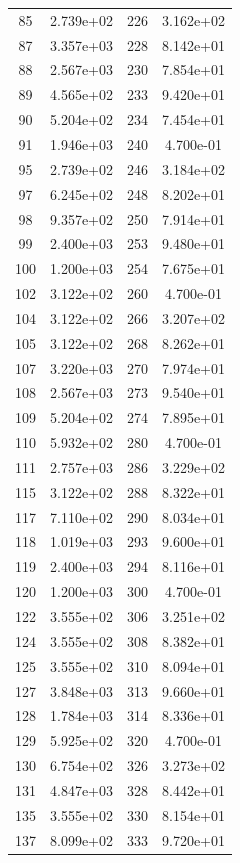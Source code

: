 \documentclass[12pt]{article}
\begin{document}
\begin{longtable}{@{}cccc@{}}
85 & 2.739e+02 & 226 & 3.162e+02 \\
87 & 3.357e+03 & 228 & 8.142e+01 \\
88 & 2.567e+03 & 230 & 7.854e+01 \\
89 & 4.565e+02 & 233 & 9.420e+01 \\
90 & 5.204e+02 & 234 & 7.454e+01 \\
91 & 1.946e+03 & 240 & 4.700e-01 \\
95 & 2.739e+02 & 246 & 3.184e+02 \\
97 & 6.245e+02 & 248 & 8.202e+01 \\
98 & 9.357e+02 & 250 & 7.914e+01 \\
99 & 2.400e+03 & 253 & 9.480e+01 \\
100 & 1.200e+03 & 254 & 7.675e+01 \\
102 & 3.122e+02 & 260 & 4.700e-01 \\
104 & 3.122e+02 & 266 & 3.207e+02 \\
105 & 3.122e+02 & 268 & 8.262e+01 \\
107 & 3.220e+03 & 270 & 7.974e+01 \\
108 & 2.567e+03 & 273 & 9.540e+01 \\
109 & 5.204e+02 & 274 & 7.895e+01 \\
110 & 5.932e+02 & 280 & 4.700e-01 \\
111 & 2.757e+03 & 286 & 3.229e+02 \\
115 & 3.122e+02 & 288 & 8.322e+01 \\
117 & 7.110e+02 & 290 & 8.034e+01 \\
118 & 1.019e+03 & 293 & 9.600e+01 \\
119 & 2.400e+03 & 294 & 8.116e+01 \\
120 & 1.200e+03 & 300 & 4.700e-01 \\
122 & 3.555e+02 & 306 & 3.251e+02 \\
124 & 3.555e+02 & 308 & 8.382e+01 \\
125 & 3.555e+02 & 310 & 8.094e+01 \\
127 & 3.848e+03 & 313 & 9.660e+01 \\
128 & 1.784e+03 & 314 & 8.336e+01 \\
129 & 5.925e+02 & 320 & 4.700e-01 \\
130 & 6.754e+02 & 326 & 3.273e+02 \\
131 & 4.847e+03 & 328 & 8.442e+01 \\
135 & 3.555e+02 & 330 & 8.154e+01 \\
137 & 8.099e+02 & 333 & 9.720e+01 \\

\end{longtable}
\end{document}
